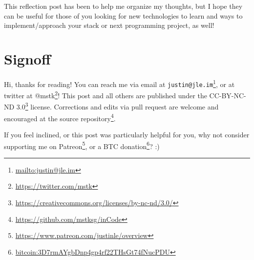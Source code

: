 \documentclass[]{article}
\renewcommand{\href}[2]{#2\footnote{\url{#1}}}
\begin{document}
This reflection post has been to help me organize my thoughts, but I hope they
can be useful for those of you looking for new technologies to learn and ways to
implement/approach your stack or next programming project, as well!

\hypertarget{signoff}{%
\section{Signoff}\label{signoff}}

Hi, thanks for reading! You can reach me via email at
\href{mailto:justin@jle.im}{\nolinkurl{justin@jle.im}}, or at twitter at
\href{https://twitter.com/mstk}{@mstk}! This post and all others are published
under the \href{https://creativecommons.org/licenses/by-nc-nd/3.0/}{CC-BY-NC-ND
3.0} license. Corrections and edits via pull request are welcome and encouraged
at \href{https://github.com/mstksg/inCode}{the source repository}.

If you feel inclined, or this post was particularly helpful for you, why not
consider \href{https://www.patreon.com/justinle/overview}{supporting me on
Patreon}, or a \href{bitcoin:3D7rmAYgbDnp4gp4rf22THsGt74fNucPDU}{BTC donation}?
:)
\end{document}
